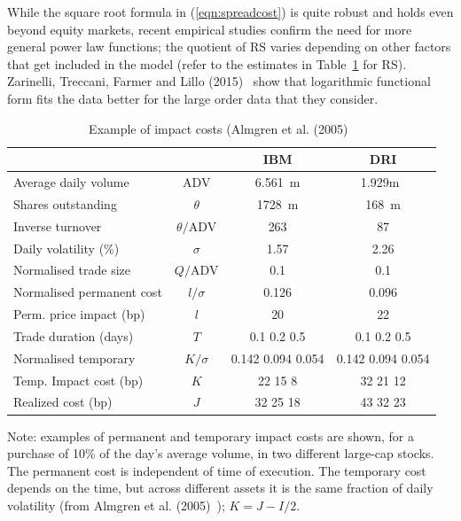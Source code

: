 While the square root formula in (\ref{eqn:spreadcost}) is quite robust and holds even beyond equity markets, recent empirical studies confirm the need for more general power law functions; the quotient of RS varies depending on other factors that get included in the model (refer to the estimates in Table~\ref{tab:costimpact} for RS). Zarinelli, Treccani, Farmer and Lillo (2015)~\cite{zar} show that logarithmic functional form fits the data better for the large order data that they consider. 


\begin{table}[!ht]
\caption{Example of impact costs (Almgren et al. (2005)~\cite{athl} \label{tab:costimpact}}
\begin{tabular}{lccc}
 & & IBM & DRI \\ \hline
Average daily volume & ADV & 6.561~m & 1.929m~ \\
Shares outstanding & $\theta$ & 1728~m & 168~m \\
Inverse turnover & $\theta/\text{ADV}$ & 263 & 87 \\
Daily volatility (\%) & $\sigma$ &1.57 & 2.26 \\
Normalised trade size & $Q/\text{ADV}$ & 0.1 & 0.1 \\ \hline
Normalised permanent cost & $l/\sigma$ & 0.126 & 0.096 \\
Perm. price impact (bp) & $l$ & 20 & 22 \\ \hline
Trade duration (days) & $T$ & 0.1 \hspace{0.2cm} 0.2 \hspace{0.2cm} 0.5 & 0.1 \hspace{0.2cm}0.2 \hspace{0.2cm} 0.5\\
Normalised temporary & $K/\sigma$ & 0.142 \hspace{0.2cm} 0.094 \hspace{0.2cm}0.054 & 0.142 \hspace{0.2cm} 0.094 \hspace{0.2cm} 0.054 \\
Temp. Impact cost (bp) & $K$ & 22 \hspace{0.2cm} 15 \hspace{0.2cm} 8 & 32  \hspace{0.2cm}21\hspace{0.2cm} 12 \\ \hline
Realized cost (bp) & $J$ & 32 \hspace{0.2cm} 25 \hspace{0.2cm} 18 & 43 \hspace{0.2cm}32 \hspace{0.2cm} 23
\end{tabular}
{\small Note: examples of permanent and temporary impact costs are shown, for a purchase of 10\% of the day's average volume, in two different large-cap stocks. The permanent cost is independent of time of execution. The temporary cost depends on the time, but across different assets it is the same fraction of daily volatility (from Almgren et al. (2005)~\cite{athl}); $K= J-I/2$.}
\end{table}


